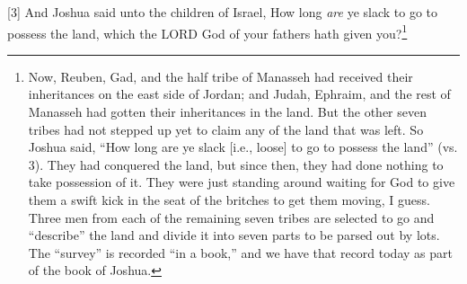 [3] \textcolor[rgb]{0.00,0.00,1.00}{And Joshua said unto the children of Israel, How long \emph{are} ye slack to go to possess the land, which the LORD God of your fathers hath given you?}\footnote{Now, Reuben, Gad, and the half tribe of
Manasseh had received their inheritances on the
east side of Jordan; and Judah, Ephraim, and
the rest of Manasseh had gotten their
inheritances in the land. But the other seven
tribes had not stepped up yet to claim any of the
land that was left. So Joshua said, “How long
are ye slack [i.e., loose] to go to possess the
land” (vs. 3). They had conquered the land, but
since then, they had done nothing to take
possession of it. They were just standing around
waiting for God to give them a swift kick in the
seat of the britches to get them moving, I guess.
Three men from each of the remaining
seven tribes are selected to go and “describe”
the land and divide it into seven parts to be
parsed out by lots. The “survey” is recorded “in
a book,” and we have that record today as part
of the book of Joshua.}
